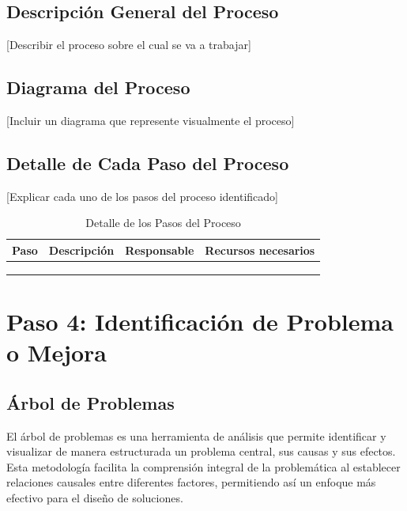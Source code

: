 \documentclass[12pt,letterpaper]{report}
\begin{document}
\subsection{Descripción General del Proceso}
[Describir el proceso sobre el cual se va a trabajar]

\subsection{Diagrama del Proceso}
[Incluir un diagrama que represente visualmente el proceso]

\subsection{Detalle de Cada Paso del Proceso}
[Explicar cada uno de los pasos del proceso identificado]

\begin{table}[H]
    \centering
    \begin{tabularx}{\textwidth}{|X|X|X|X|}
        \hline
        \textbf{Paso} & \textbf{Descripción} & \textbf{Responsable} & \textbf{Recursos necesarios} \\
        \hline
        & & & \\
        \hline
        & & & \\
        \hline
        & & & \\
        \hline
    \end{tabularx}
    \caption{Detalle de los Pasos del Proceso}
\end{table}

\section{Paso 4: Identificación de Problema o Mejora}

\subsection{Árbol de Problemas}

El árbol de problemas es una herramienta de análisis que permite identificar y visualizar de manera estructurada un problema central, sus causas y sus efectos. Esta metodología facilita la comprensión integral de la problemática al establecer relaciones causales entre diferentes factores, permitiendo así un enfoque más efectivo para el diseño de soluciones.
\end{document}
